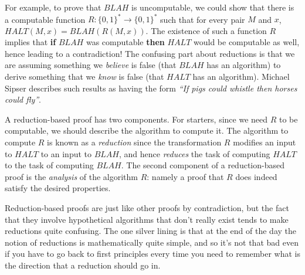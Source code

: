 For example, to prove that \(\ensuremath{\mathit{BLAH}}\) is
uncomputable, we could show that there is a computable function
\(R:\{0,1\}^* \rightarrow \{0,1\}^*\) such that for every pair \(M\) and
\(x\),
\(\ensuremath{\mathit{HALT}}(M,x)=\ensuremath{\mathit{BLAH}}(R(M,x))\).
The existence of such a function \(R\) implies that \textbf{if}
\(\ensuremath{\mathit{BLAH}}\) was computable \textbf{then}
\(\ensuremath{\mathit{HALT}}\) would be computable as well, hence
leading to a contradiction! The confusing part about reductions is that
we are assuming something we \emph{believe} is false (that
\(\ensuremath{\mathit{BLAH}}\) has an algorithm) to derive something
that we \emph{know} is false (that \(\ensuremath{\mathit{HALT}}\) has an
algorithm). Michael Sipser describes such results as having the form
\emph{``If pigs could whistle then horses could fly''}.

A reduction-based proof has two components. For starters, since we need
\(R\) to be computable, we should describe the algorithm to compute it.
The algorithm to compute \(R\) is known as a \emph{reduction} since the
transformation \(R\) modifies an input to \(\ensuremath{\mathit{HALT}}\)
to an input to \(\ensuremath{\mathit{BLAH}}\), and hence \emph{reduces}
the task of computing \(\ensuremath{\mathit{HALT}}\) to the task of
computing \(\ensuremath{\mathit{BLAH}}\). The second component of a
reduction-based proof is the \emph{analysis} of the algorithm \(R\):
namely a proof that \(R\) does indeed satisfy the desired properties.

Reduction-based proofs are just like other proofs by contradiction, but
the fact that they involve hypothetical algorithms that don't really
exist tends to make reductions quite confusing. The one silver lining is
that at the end of the day the notion of reductions is mathematically
quite simple, and so it's not that bad even if you have to go back to
first principles every time you need to remember what is the direction
that a reduction should go in.

